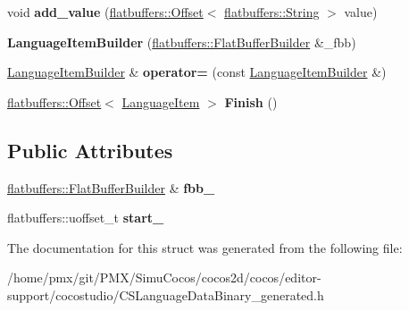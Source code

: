 \begin{DoxyCompactItemize}
\item 
\mbox{\label{structflatbuffers_1_1LanguageItemBuilder_a6022a1392c5f5fd9c9edcc628779ff60}} 
void {\bfseries add\+\_\+value} (\hyperlink{structflatbuffers_1_1Offset}{flatbuffers\+::\+Offset}$<$ \hyperlink{structflatbuffers_1_1String}{flatbuffers\+::\+String} $>$ value)
\item 
\mbox{\label{structflatbuffers_1_1LanguageItemBuilder_a040b74edda450561ad71beba1d4070bc}} 
{\bfseries Language\+Item\+Builder} (\hyperlink{classflatbuffers_1_1FlatBufferBuilder}{flatbuffers\+::\+Flat\+Buffer\+Builder} \&\+\_\+fbb)
\item 
\mbox{\label{structflatbuffers_1_1LanguageItemBuilder_a05fe7a96950138cd22f3c75c7c1ef098}} 
\hyperlink{structflatbuffers_1_1LanguageItemBuilder}{Language\+Item\+Builder} \& {\bfseries operator=} (const \hyperlink{structflatbuffers_1_1LanguageItemBuilder}{Language\+Item\+Builder} \&)
\item 
\mbox{\label{structflatbuffers_1_1LanguageItemBuilder_a3b45d4a3a19a45e96d56a7006b2b1203}} 
\hyperlink{structflatbuffers_1_1Offset}{flatbuffers\+::\+Offset}$<$ \hyperlink{structflatbuffers_1_1LanguageItem}{Language\+Item} $>$ {\bfseries Finish} ()
\end{DoxyCompactItemize}
\subsection*{Public Attributes}
\begin{DoxyCompactItemize}
\item 
\mbox{\label{structflatbuffers_1_1LanguageItemBuilder_afb44e0ca2f741419b3bdb343daad3b92}} 
\hyperlink{classflatbuffers_1_1FlatBufferBuilder}{flatbuffers\+::\+Flat\+Buffer\+Builder} \& {\bfseries fbb\+\_\+}
\item 
\mbox{\label{structflatbuffers_1_1LanguageItemBuilder_a57a1d11025ff69db16b23e88542ac1e7}} 
flatbuffers\+::uoffset\+\_\+t {\bfseries start\+\_\+}
\end{DoxyCompactItemize}


The documentation for this struct was generated from the following file\+:\begin{DoxyCompactItemize}
\item 
/home/pmx/git/\+P\+M\+X/\+Simu\+Cocos/cocos2d/cocos/editor-\/support/cocostudio/C\+S\+Language\+Data\+Binary\+\_\+generated.\+h\end{DoxyCompactItemize}
